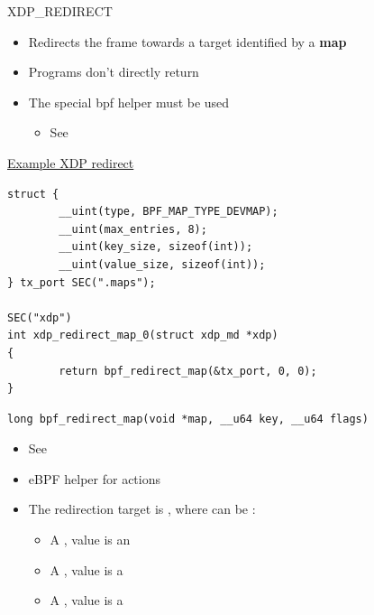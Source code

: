 \begin{frame}[fragile]{XDP\_REDIRECT}
	\begin{itemize}
		\item Redirects the frame towards a target identified by a \textbf{map}
		\item Programs don't directly return 
		\item The special bpf helper  must be used
			\begin{itemize}
				\item See 
			\end{itemize}
	\end{itemize}
	\begin{block}{\href{https://elixir.bootlin.com/linux/v6.15.1/source/tools/testing/selftests/bpf/progs/xdp_redirect_map.c}{Example XDP redirect}}
		{\fontsize{8}{9}
		\begin{verbatim}
struct {
        __uint(type, BPF_MAP_TYPE_DEVMAP);
        __uint(max_entries, 8);
        __uint(key_size, sizeof(int));
        __uint(value_size, sizeof(int));
} tx_port SEC(".maps");

SEC("xdp")
int xdp_redirect_map_0(struct xdp_md *xdp)
{
        return bpf_redirect_map(&tx_port, 0, 0);
}
		\end{verbatim}
		}
	\end{block}
\end{frame}

\begin{frame}[fragile]{}
	\begin{verbatim}
long bpf_redirect_map(void *map, __u64 key, __u64 flags)
	\end{verbatim}
	\begin{itemize}
		\item See 
		\item eBPF helper for  actions
		\item The redirection target is , where  can be :
			\begin{itemize}
				\item A , value is an 
				\item A , value is a 
				\item A , value is a 
			\end{itemize}
	\end{itemize}
\end{frame}

